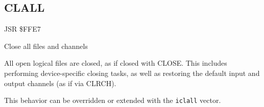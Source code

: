 
\newpage
\subsection{CLALL}
\label{KERNAL Jump Table!CLALL}
\begin{description}[leftmargin=2cm,style=nextline]
    \item [Address:] JSR \$FFE7
    \item [Description:] Close all files and channels
    \item [Remarks:]
        All open logical files are closed, as if closed with CLOSE. This includes performing device-specific closing tasks, as well as restoring the default input and output channels (as if via CLRCH).

        This behavior can be overridden or extended with the \texttt{iclall} vector.
    \item [Example:]
\end{description}



\newpage
